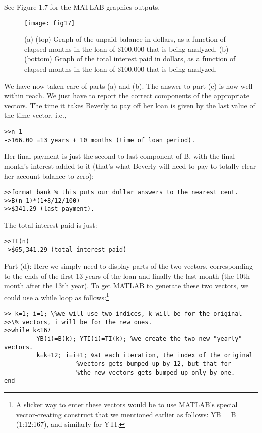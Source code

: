 \documentclass[../main.tex]{subfiles}
\begin{document}
See Figure 1.7 for the MATLAB graphics outputs.

\begin{figure}[H]
\centering
\texttt{[image: fig17]}
\caption{(a) (top) Graph of the unpaid balance in dollars, as a function of elapsed
months in the loan of \$100,000 that is being analyzed, (b) (bottom) Graph of the total
interest paid in dollars, as a function of elapsed months in the loan of \$100,000 that is being
analyzed. }
\label{fig:fig_1_7}
\end{figure}

We have now taken care of parts (a) and (b). The answer to part (c) is now well
within reach. We just have to report the correct components of the appropriate
vectors. The time it takes Beverly to pay off her loan is given by the last value of
the time vector, i.e.,

\begin{verbatim}
>>n-1
->166.00 =13 years + 10 months (time of loan period).
\end{verbatim}

Her final payment is just the second-to-last component of B, with the final month's
interest added to it (that's what Beverly will need to pay to totally clear her
account balance to zero):

\begin{verbatim}
>>format bank % this puts our dollar answers to the nearest cent.
>>B(n-1)*(1+8/12/100) 
>>$341.29 (last payment).
\end{verbatim}

The total interest paid is just: 

\begin{verbatim}
>>TI(n) 
->$65,341.29 (total interest paid)
\end{verbatim}

Part (d): Here we simply need to display parts of the two vectors, corresponding
to the ends of the first 13 years of the loan and finally the last month (the 10th
month after the 13th year). To get MATLAB to generate these two vectors, we
could use a while loop as follows:\footnote[6]{A slicker way to enter these vectors would be to use MATLAB's special vector-creating construct
that we mentioned earlier as follows: YB = B (1:12:167), and similarly for YTI. }

\begin{verbatim}
>> k=1; i=1; \%we will use two indices, k will be for the original
>>\% vectors, i will be for the new ones.
>>while k<167
		 YB(i)=B(k); YTI(i)=TI(k); %we create the two new "yearly" vectors. 
		 k=k+12; i=i+1; %at each iteration, the index of the original
					%vectors gets bumped up by 12, but that for
					%the new vectors gets bumped up only by one.
end 
\end{verbatim}
\end{document}

